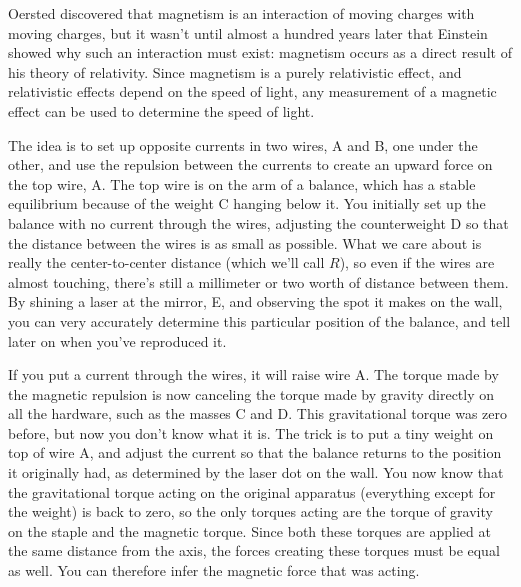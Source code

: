 \label{lab:relativity}

\apparatus
{}


\introduction

Oersted discovered that magnetism is an interaction of moving
charges with moving charges, but it wasn't until almost a hundred
years later that Einstein showed why such an interaction must
exist: magnetism occurs as a direct result of his theory of
relativity. Since magnetism is a purely relativistic effect,
and relativistic effects depend on the speed of light, any
measurement of a magnetic effect can be used to determine the
speed of light.

\setup

The idea is to set up opposite currents in two wires, A and B, one under
the other, and use the repulsion between the currents to create an upward force on
the top wire, A. The top wire is on the arm of a balance, which has
a stable equilibrium because of the weight C hanging below it. 
You initially set up the balance with no current through the wires,
adjusting the counterweight D so that the distance between the wires
is as small as possible. What we care about is
really the center-to-center distance (which we'll call $R$),
so even if the wires are almost touching, there's still
a millimeter or two worth of distance between them. By shining a laser at
the mirror, E, and observing the spot it makes on the wall, you can very
accurately determine this particular position of the balance, and tell later
on when you've reproduced it.


If you put a current through the wires, it will raise wire A. The
torque made by the magnetic repulsion is now canceling the torque made
by gravity directly on all the hardware, such as the masses C and D.
This gravitational torque was zero before, but now you don't know what it
is. The trick is to put a tiny weight on top of wire A, and
adjust the current so that the balance returns to the position it originally
had, as determined by the laser dot on the wall. You now know that the
gravitational torque acting on the original apparatus (everything except
for the weight) is back to zero, so the only torques acting are the torque
of gravity on the staple and the magnetic torque. Since both these torques
are applied at the same distance from the axis, the forces creating these
torques must be equal as well. You can therefore infer the magnetic force that was
acting.

